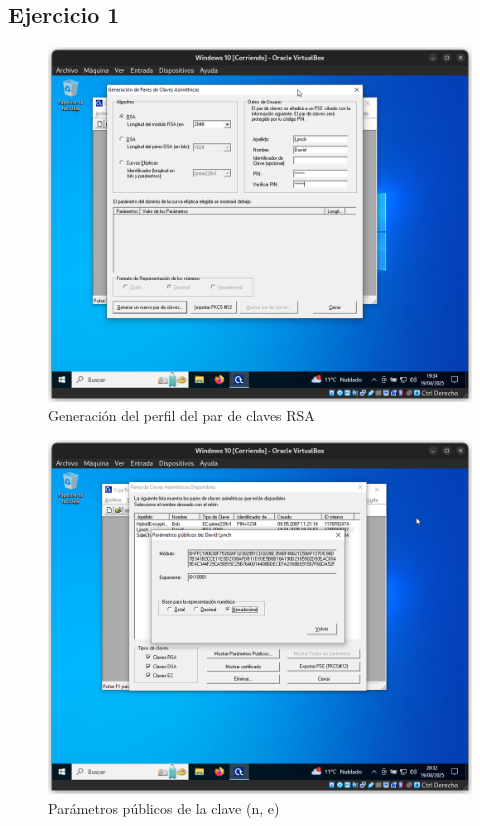 \subsection{Ejercicio 1}
\graphicspath{ {img/1} }

\begin{figure}[h]
    \includegraphics[width=15cm]{ClavesRSA-01.png}
    \caption{Generación del perfil del par de claves RSA}
\end{figure}

\begin{figure}[h]
    \includegraphics[width=15cm]{ClavesRSA-02.png}
    \caption{Parámetros públicos de la clave (n, e)}
\end{figure}

